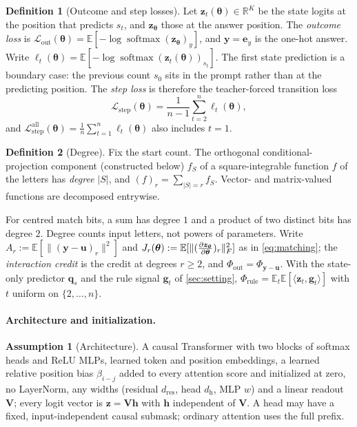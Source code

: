 \documentclass[11pt]{article}
\theoremstyle{definition}
\newtheorem{definition}{Definition}
\newtheorem{assumption}{Assumption}
\theoremstyle{remark}
\newcommand{\E}{\mathbb E}
\newcommand{\R}{\mathbb R}
\newcommand{\softmax}{\operatorname{softmax}}
\newcommand{\Lout}{\mathcal L_{\mathrm{out}}}
\newcommand{\Lstep}{\mathcal L_{\mathrm{step}}}
\newcommand{\cred}{\Phi}
\newcommand{\outcredit}{\cred_{\mathrm{out}}}
\newcommand{\rulecredit}{\cred_{\mathrm{rule}}}
\newcommand{\Jz}{\mathchoice{\frac{\partial\bm z_{\bm\theta}}{\partial\bm\theta}}{\tfrac{\partial\bm z_{\bm\theta}}{\partial\bm\theta}}{\partial\bm z_{\bm\theta}/\partial\bm\theta}{\partial\bm z_{\bm\theta}/\partial\bm\theta}}
\begin{document}
\begin{definition}[Outcome and step losses]
\label{def:losses}
Let $\bm z_t(\bm\theta)\in\R^K$ be the state logits at the position that predicts $s_t$, and $\bm z_{\bm\theta}$
those at the answer position. The \emph{outcome loss} is $\Lout(\bm\theta)=\E[-\log\softmax(\bm z_{\bm\theta})_y]$, and $\bm y=\bm e_y$ is the one-hot answer.
Write $\ell_t(\bm\theta)=\E[-\log\softmax(\bm z_t(\bm\theta))_{s_t}]$. The first state prediction is a boundary case: the previous
count $s_0$ sits in the prompt rather than at the predicting position. The \emph{step loss} is therefore the teacher-forced
transition loss
\[
 \Lstep(\bm\theta)=\frac{1}{n-1}\sum_{t=2}^n\ell_t(\bm\theta),
\]
and $\Lstep^{\mathrm{all}}(\bm\theta)=\tfrac{1}{n}\sum_{t=1}^n\ell_t(\bm\theta)$ also includes $t=1$.
\end{definition}

\begin{definition}[Degree]
\label{def:degree}
Fix the start count. The orthogonal conditional-projection component (constructed below) $f_S$ of a square-integrable function $f$ of the letters has
\emph{degree} $|S|$, and $(f)_r=\sum_{|S|=r}f_S$. Vector- and matrix-valued functions are decomposed entrywise.
\end{definition}
For centred match bits, a sum has degree $1$ and a product of two distinct bits has degree $2$.
Degree counts input letters, not powers of parameters. Write $A_r:=\E[\|(\bm y-\bm u)_r\|^2]$ and $J_r(\bm\theta):=\E[\|(\Jz)_r\|_F^2]$ as in \cref{eq:matching}; the
\emph{interaction credit} is the credit at degrees $r\ge2$, and $\outcredit=\cred_{\bm y-\bm u}$. With the state-only predictor
$\bm q_s$ and the rule signal $\bm g_t$ of \cref{sec:setting}, $\rulecredit=\E_t\E[\langle\bm z_t,\bm g_t\rangle]$ with $t$ uniform on $\{2,\ldots,n\}$.

\paragraph{Architecture and initialization.}

\begin{assumption}[Architecture]
\label{ass:arch}
A causal Transformer with two blocks of softmax heads and ReLU MLPs, learned token and position
embeddings, a learned relative position bias $\beta_{i-j}$ added to every attention score and initialized at zero, no
LayerNorm, any widths (residual $d_{\mathrm{res}}$, head $d_{\mathrm h}$, MLP $w$) and a linear readout $\mathbf V$;
every logit vector is $\bm z=\mathbf V\bm h$ with $\bm h$ independent of $\mathbf V$. A head may have a fixed, input-independent causal submask;
ordinary attention uses the full prefix.
\end{assumption}
\end{document}
